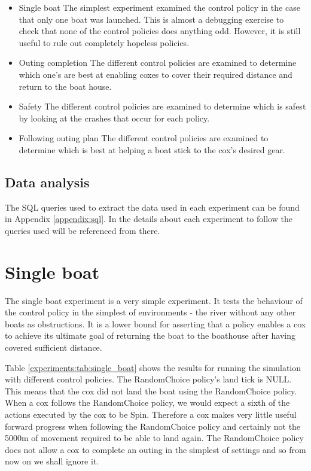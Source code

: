   \begin{itemize}
    \item{Single boat}
    The simplest experiment examined the control policy in the case
    that only one boat was launched. This is almost a debugging
    exercise to check that none of the control policies does anything
    odd. However, it is still useful to rule out completely hopeless policies.
  
    \item{Outing completion}
    The different control policies are examined to determine which
    one's are best at enabling coxes to cover their required distance
    and return to the boat house.
    
    \item{Safety}
    The different control policies are examined to determine which is
    safest by looking at the crashes that occur for each policy.

    \item{Following outing plan}
    The different control policies are examined to determine which is
    best at helping a boat stick to the cox's desired gear.
  \end{itemize}

  \subsection{Data analysis}
  The SQL queries used to extract the data used in each experiment can be found in Appendix \ref{appendix:sql}. In the details about each experiment to follow the queries used will be referenced from there.

\section{Single boat}
  The single boat experiment is a very simple experiment. It tests the behaviour of the control policy in the simplest of environments - the river without any other boats as obstructions. It is a lower bound for asserting that a policy enables a cox to achieve its ultimate goal of returning the boat to the boathouse after having covered sufficient distance.
  
  Table \ref{experiments:tab:single_boat} shows the results for running the simulation with different control policies. The RandomChoice policy's land tick is NULL. This means that the cox did not land the boat using the RandomChoice policy. When a cox follows the RandomChoice policy, we would expect a sixth of the actions executed by the cox to be Spin. Therefore a cox makes very little useful forward progress when following the RandomChoice policy and certainly not the 5000m of movement required to be able to land again. The RandomChoice policy does not allow a cox to complete an outing in the simplest of settings and so from now on we shall ignore it.
  
